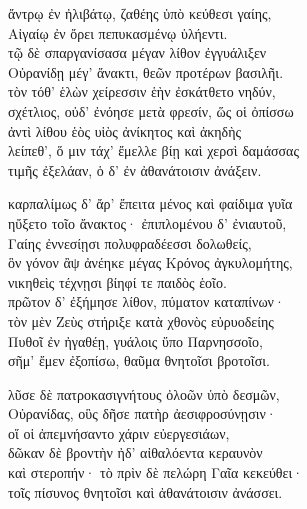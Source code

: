 ἄντρῳ ἐν ἠλιβάτῳ, ζαθέης ὑπὸ κεύθεσι γαίης,\\
Αἰγαίῳ ἐν ὄρει πεπυκασμένῳ ὑλήεντι.\\
τῷ δὲ σπαργανίσασα μέγαν λίθον ἐγγυάλιξεν \\
Οὐρανίδῃ μέγ' ἄνακτι, θεῶν προτέρων βασιλῆι.\\
τὸν τόθ' ἑλὼν χείρεσσιν ἑὴν ἐσκάτθετο νηδύν, \\
σχέτλιος, οὐδ' ἐνόησε μετὰ φρεσίν, ὥς οἱ ὀπίσσω \\
ἀντὶ λίθου ἑὸς υἱὸς ἀνίκητος καὶ ἀκηδὴς\\
λείπεθ', ὅ μιν τάχ' ἔμελλε βίῃ καὶ χερσὶ δαμάσσας \\
τιμῆς ἐξελάαν, ὁ δ' ἐν ἀθανάτοισιν ἀνάξειν. 

\quad{}καρπαλίμως δ' ἄρ' ἔπειτα μένος καὶ φαίδιμα γυῖα\\
ηὔξετο τοῖο ἄνακτος· ἐπιπλομένου δ' ἐνιαυτοῦ, \\
Γαίης ἐννεσίῃσι πολυφραδέεσσι δολωθείς, \\
ὃν γόνον ἂψ ἀνέηκε μέγας Κρόνος ἀγκυλομήτης,  \\
νικηθεὶς τέχνῃσι βίηφί τε παιδὸς ἑοῖο.\\
πρῶτον δ' ἐξήμησε λίθον, πύματον καταπίνων·\\
τὸν μὲν Ζεὺς στήριξε κατὰ χθονὸς εὐρυοδείης\\
Πυθοῖ ἐν ἠγαθέῃ, γυάλοις ὕπο Παρνησσοῖο, \\
σῆμ' ἔμεν ἐξοπίσω, θαῦμα θνητοῖσι βροτοῖσι.  

\quad{}λῦσε δὲ πατροκασιγνήτους ὀλοῶν ὑπὸ δεσμῶν, \\
Οὐρανίδας, οὓς δῆσε πατὴρ ἀεσιφροσύνῃσιν· \\
οἵ οἱ ἀπεμνήσαντο χάριν εὐεργεσιάων,\\
δῶκαν δὲ βροντὴν ἠδ' αἰθαλόεντα κεραυνὸν\\
καὶ στεροπήν· τὸ πρὶν δὲ πελώρη Γαῖα κεκεύθει·  \\
τοῖς πίσυνος θνητοῖσι καὶ ἀθανάτοισιν ἀνάσσει.

